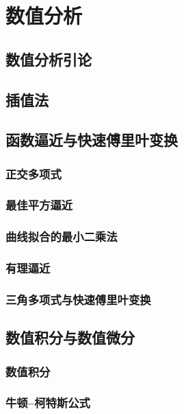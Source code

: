 \part{数值分析}
\chapter{数值分析引论}





\chapter{插值法}







\chapter{函数逼近与快速傅里叶变换}

\section{正交多项式}
\section{最佳平方逼近}
\section{曲线拟合的最小二乘法}
\section{有理逼近}
\section{三角多项式与快速傅里叶变换}

\chapter{数值积分与数值微分}
\section{数值积分}
\section{牛顿--柯特斯公式}
